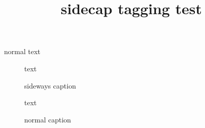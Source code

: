\documentclass{article}
\title{sidecap tagging test}
\begin{document}
normal text

\begin{SCfigure}[10]
text
\caption{sideways caption}
\end{SCfigure}

\begin{figure}
text
\caption{normal caption}
\end{figure}
\end{document}
